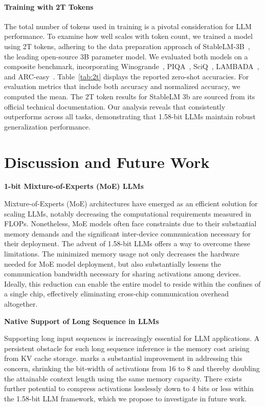\paragraph{Training with 2T Tokens}

The total number of tokens used in training is a pivotal consideration for LLM performance. To examine how well  scales with token count, we trained a  model using 2T tokens, adhering to the data preparation approach of StableLM-3B~\cite{StableLM-3B-4E1T}, the leading open-source 3B parameter model. We evaluated both models on a composite benchmark, incorporating Winogrande~\cite{winoGrande}, PIQA~\cite{piqa}, SciQ~\cite{sciq}, LAMBADA~\cite{lambada}, and ARC-easy~\cite{arc}. Table~\ref{tab:2t} displays the reported zero-shot accuracies. For evaluation metrics that include both accuracy and normalized accuracy, we computed the mean. The 2T token results for StableLM 3b are sourced from its official technical documentation. Our analysis reveals that  consistently outperforms across all tasks, demonstrating that 1.58-bit LLMs maintain robust generalization performance.

\section{Discussion and Future Work}

\textbf{1-bit Mixture-of-Experts (MoE) LLMs}

Mixture-of-Experts (MoE) architectures have emerged as an efficient solution for scaling LLMs, notably decreasing the computational requirements measured in FLOPs. Nonetheless, MoE models often face constraints due to their substantial memory demands and the significant inter-device communication necessary for their deployment. The advent of 1.58-bit LLMs offers a way to overcome these limitations. The minimized memory usage not only decreases the hardware needed for MoE model deployment, but also substantially lessens the communication bandwidth necessary for sharing activations among devices. Ideally, this reduction can enable the entire model to reside within the confines of a single chip, effectively eliminating cross-chip communication overhead altogether.

\textbf{Native Support of Long Sequence in LLMs}

Supporting long input sequences is increasingly essential for LLM applications. A persistent obstacle for such long sequence inference is the memory cost arising from KV cache storage.  marks a substantial improvement in addressing this concern, shrinking the bit-width of activations from 16 to 8 and thereby doubling the attainable context length using the same memory capacity. There exists further potential to compress activations losslessly down to 4 bits or less within the 1.58-bit LLM framework, which we propose to investigate in future work.

